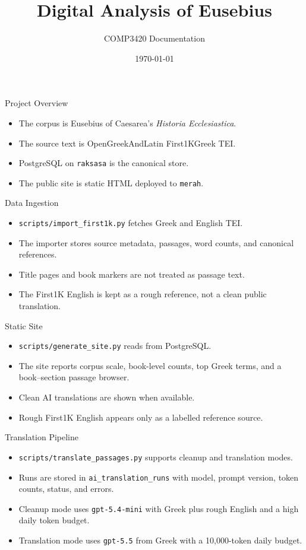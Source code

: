 \documentclass{beamer}
\title{Digital Analysis of Eusebius}
\author{COMP3420 Documentation}
\date{\today}
\begin{document}
\begin{frame}
  \titlepage
\end{frame}

\begin{frame}{Project Overview}
  \begin{itemize}
    \item The corpus is Eusebius of Caesarea's \emph{Historia Ecclesiastica}.
    \item The source text is OpenGreekAndLatin First1KGreek TEI.
    \item PostgreSQL on \texttt{raksasa} is the canonical store.
    \item The public site is static HTML deployed to \texttt{merah}.
  \end{itemize}
\end{frame}

\begin{frame}{Data Ingestion}
  \begin{itemize}
    \item \texttt{scripts/import\_first1k.py} fetches Greek and English TEI.
    \item The importer stores source metadata, passages, word counts, and canonical references.
    \item Title pages and book markers are not treated as passage text.
    \item The First1K English is kept as a rough reference, not a clean public translation.
  \end{itemize}
\end{frame}

\begin{frame}{Static Site}
  \begin{itemize}
    \item \texttt{scripts/generate\_site.py} reads from PostgreSQL.
    \item The site reports corpus scale, book-level counts, top Greek terms, and a book--section passage browser.
    \item Clean AI translations are shown when available.
    \item Rough First1K English appears only as a labelled reference source.
  \end{itemize}
\end{frame}

\begin{frame}{Translation Pipeline}
  \begin{itemize}
    \item \texttt{scripts/translate\_passages.py} supports cleanup and translation modes.
    \item Runs are stored in \texttt{ai\_translation\_runs} with model, prompt version, token counts, status, and errors.
    \item Cleanup mode uses \texttt{gpt-5.4-mini} with Greek plus rough English and a high daily token budget.
    \item Translation mode uses \texttt{gpt-5.5} from Greek with a 10,000-token daily budget.
  \end{itemize}
\end{frame}
\end{document}
